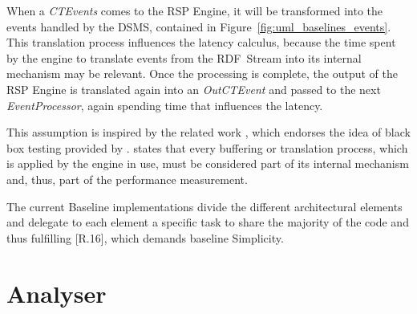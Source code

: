 When a \textit{CTEvents} comes to the RSP Engine, it will be transformed into the events handled by the DSMS, contained in Figure~\ref{fig:uml_baselines_events}. This translation process influences the latency calculus, because the time spent by the engine to translate events from the RDF~Stream into its internal mechanism may be relevant. Once the processing is complete, the output of the RSP Engine is translated again into an \textit{OutCTEvent} and passed to the next \textit{EventProcessor}, again spending time that influences the latency. 

This assumption is inspired by the related work \cite{bizarro:DSP:2007:1143}, which endorses the idea of black box testing provided by \namens. \cite{bizarro:DSP:2007:1143} states that every buffering or translation process, which is applied by the engine in use, must be considered part of its internal mechanism and, thus, part of the performance measurement.

The current Baseline implementations divide the different architectural elements and delegate to each element a specific task to share the majority of the code and thus fulfilling [R.16], which demands baseline Simplicity.

%

\pagebreak

\section{Analyser}\label{sec:analyser-impl}

